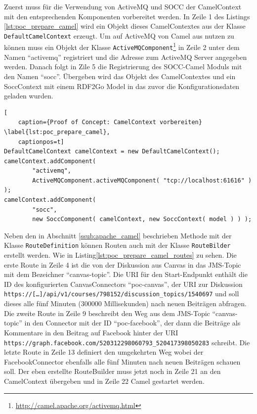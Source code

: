 Zuerst muss für die Verwendung von ActiveMQ und SOCC der CamelContext mit den entsprechenden Komponenten vorbereitet werden. In Zeile 1 des Listings \ref{lst:poc_prepare_camel} wird ein Objekt dieses CamelContextes aus der Klasse \texttt{DefaultCamelContext} erzeugt. Um auf ActiveMQ von Camel aus nutzen zu können muss ein Objekt der Klasse \texttt{ActiveMQComponent}\footnote{\url{http://camel.apache.org/activemq.html}} in Zeile 2 unter dem Namen \enquote{activemq} registriert und die Adresse zum ActiveMQ Server angegeben werden. Danach folgt in Zile 5 die Registrierung des SOCC-Camel Moduls mit den Namen \enquote{socc}. Übergeben wird das Objekt des CamelContextes und ein SoccContext mit einem RDF2Go Model in das zuvor die Konfigurationsdaten geladen wurden.  

\begin{lstlisting}[
    caption={Proof of Concept: CamelContext vorbereiten} \label{lst:poc_prepare_camel},
    captionpos=t]
DefaultCamelContext camelContext = new DefaultCamelContext();
camelContext.addComponent(
        "activemq",
        ActiveMQComponent.activeMQComponent( "tcp://localhost:61616" ) );
camelContext.addComponent(
        "socc",
        new SoccComponent( camelContext, new SoccContext( model ) ) );
\end{lstlisting}

Neben den in Abschnitt \ref{ssub:apache_camel} beschrieben Methode mit der Klasse \texttt{RouteDefinition} können Routen auch mit der Klasse \texttt{RouteBilder} erstellt werden. Wie in Listing\ref{lst:poc_prepare_camel_routes} zu sehen. Die erste Route in Zeile 4 ist die von der Diskussion aus Canvas in das JMS-Topic mit dem Bezeichner \enquote{canvas-topic}. Die URI für den Start-Endpunkt enthält die ID des konfigurierten CanvasConnectors \enquote{poc-canvas}, der URI zur Diskussion \texttt{https://[\dots]/api/v1/courses/798152/discussion\_topics/1540697} und soll dieses alle fünf Minuten (300000 Millisekunden) nach neuen Beiträgen abfragen. Die zweite Route in Zeile 9 beschreibt den Weg aus dem JMS-Topic \enquote{canvas-topic} in den Connector mit der ID \enquote{poc-facebook}, der dann die Beiträge als Kommentare in den Beitrag auf Facebook hinter der URI \texttt{https://graph.facebook.com/520312298060793\_520417398050283} schreibt. Die letzte Route in Zeile 13 definiert den umgekehrten Weg wobei der FacebookConnector ebenfalls alle fünf Minuten nach neuen Beiträgen schauen soll. Der eben erstellte RouteBuilder muss jetzt noch in Zeile 21 an den CamelContext übergeben und in Zeile 22 Camel gestartet werden.  

